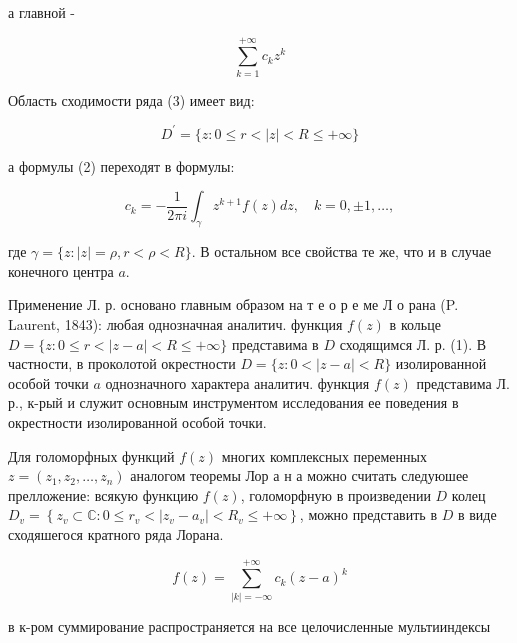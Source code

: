 \documentclass[10pt]{article}
\begin{document}
а главной -



\[

\sum_{k=1}^{+\infty} c_{k} z^{k}

\]



Область сходимости ряда (3) имеет вид:



\[

D^{\prime}=\{z: 0 \leqslant r<|z|<R \leqslant+\infty\}

\]



а формулы (2) переходят в формулы:



\[

c_{k}=-\frac{1}{2 \pi i} \int_{\gamma} z^{k+1} f(z) d z, \quad k=0, \pm 1, \ldots,

\]



где $\gamma=\{z:|z|=\rho, r<\rho<R\}$. В остальном все свойства те же, что и в случае конечного центра $a$.



Применение Л. р. основано главным образом на т е о р е ме Л о рана (P. Laurent, 1843): любая однозначная аналитич. функция $f(z)$ в кольце $D=\{z: 0 \leqslant r<|z-a|<R \leqslant+\infty\}$ представима в $D$ сходящимся Л. р. (1). В частности, в проколотой окрестности $D=\{z: 0<|z-a|<R\}$ изолированной особой точки $a$ однозначного характера аналитич. функция $f(z)$ представима Л. р., к-рый и служит основным инструментом исследования ее поведения в окрестности изолированной особой точки.



Для голоморфных функций $f(z)$ многих комплексных переменных $z=\left(z_{1}, z_{2}, \ldots, z_{n}\right)$ аналогом теоремы Лор а н а можно считать следуюшее прелложение: всякую функцию $f(z)$, голоморфную в произведении $D$ колец $D_{v}=\left\{z_{v} \subset \mathbb{C}: 0 \leqslant r_{v}<\left|z_{v}-a_{v}\right|<R_{v} \leqslant+\infty\right\}$, можно представить в $D$ в виде сходяшегося кратного ряда Лорана.



\[

f(z)=\sum_{|k|=-\infty}^{+\infty} c_{k}(z-a)^{k}

\]



в к-ром суммирование распространяется на все целочисленные мультииндексы
\end{document}
